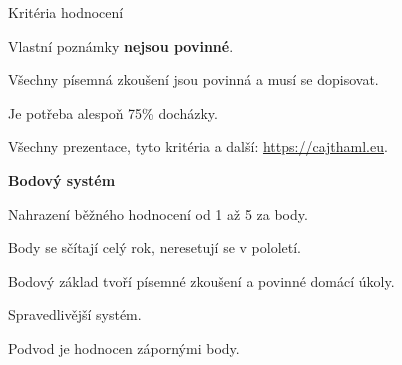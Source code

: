 \documentclass[aspectratio=169]{beamer}
\begin{document}
\begin{frame}{Kritéria hodnocení}
    \begin{cardTiny}
        \begin{flushleft}
            Vlastní poznámky \textbf{nejsou povinné}.

            Všechny písemná zkoušení jsou povinná a musí se dopisovat.

            Je potřeba alespoň 75\% docházky.

            Všechny prezentace, tyto kritéria a další: \href{https://cajthaml.eu/}{https://cajthaml.eu}.
        \end{flushleft}
    \end{cardTiny}
    \begin{cardTiny}
        \textbf{Bodový systém}
            
        \begin{flushleft}
            Nahrazení běžného hodnocení od 1 až 5 za body.

            Body se sčítají celý rok, neresetují se v pololetí.

            Bodový základ tvoří písemné zkoušení a povinné domácí úkoly.

            Spravedlivější systém.

            Podvod je hodnocen zápornými body.
        \end{flushleft}
    \end{cardTiny}
\end{frame}
\end{document}
